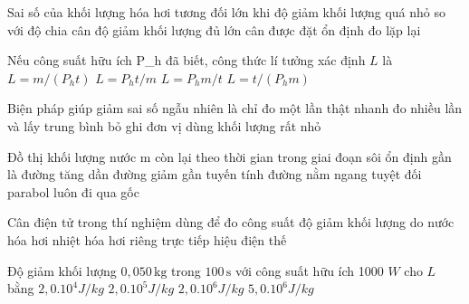 \begin{ex}
Sai số của khối lượng hóa hơi tương đối lớn khi
\choice
{\True độ giảm khối lượng quá nhỏ so với độ chia cân}
{độ giảm khối lượng đủ lớn}
{cân được đặt ổn định}
{đo lặp lại}
\end{ex}

\begin{ex}
Nếu công suất hữu ích P_h đã biết, công thức lí tưởng xác định $L$ là
\choice
{$L=m/(P_ht)$}
{\True $L=P_ht/m$}
{$L=P_hm/t$}
{$L=t/(P_hm)$}
\end{ex}

\begin{ex}
Biện pháp giúp giảm sai số ngẫu nhiên là
\choice
{chỉ đo một lần thật nhanh}
{\True đo nhiều lần và lấy trung bình}
{bỏ ghi đơn vị}
{dùng khối lượng rất nhỏ}
\end{ex}

\begin{ex}
Đồ thị khối lượng nước m còn lại theo thời gian trong giai đoạn sôi ổn định gần là
\choice
{đường tăng dần}
{\True đường giảm gần tuyến tính}
{đường nằm ngang tuyệt đối}
{parabol luôn đi qua gốc}
\end{ex}

\begin{ex}
Cân điện tử trong thí nghiệm dùng để đo
\choice
{công suất}
{\True độ giảm khối lượng do nước hóa hơi}
{nhiệt hóa hơi riêng trực tiếp}
{hiệu điện thế}
\end{ex}

\begin{ex}
Độ giảm khối lượng $0,050\,\text{kg}$ trong $100\,\text{s}$ với công suất hữu ích 1000 $W$ cho $L$ bằng
\choice
{$2,0.10^4 J/kg$}
{$2,0.10^5 J/kg$}
{\True $2,0.10^6 J/kg$}
{$5,0.10^6 J/kg$}
\end{ex}

